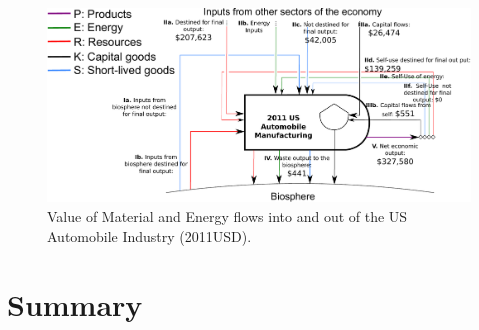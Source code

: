 \begin{figure}[h!]
\centering
\includegraphics[width=1.0\linewidth]{Part_3/Chapter_Values/images/PERKS_basic_unit_value_auto_ind.pdf}
\caption{Value of Material and Energy flows into and out of the US Automobile Industry (2011USD).}
\label{fig:PERKS_value_auto_ind}
\end{figure}

\section{Summary}
\label{sec:value_summary}







%
%


